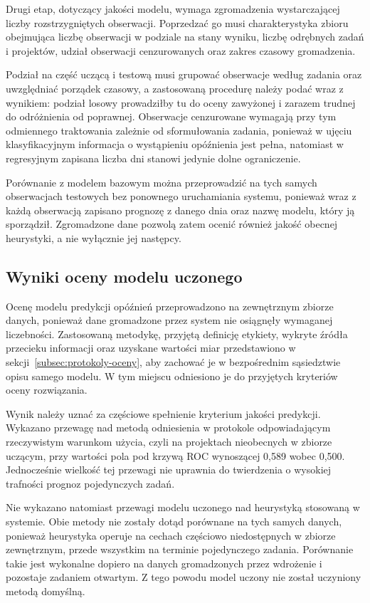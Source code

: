 Drugi etap, dotyczący jakości modelu, wymaga zgromadzenia wystarczającej liczby rozstrzygniętych obserwacji. Poprzedzać go musi charakterystyka zbioru obejmująca liczbę obserwacji w podziale na stany wyniku, liczbę odrębnych zadań i projektów, udział obserwacji cenzurowanych oraz zakres czasowy gromadzenia.

Podział na część uczącą i testową musi grupować obserwacje według zadania oraz uwzględniać porządek czasowy, a zastosowaną procedurę należy podać wraz z wynikiem: podział losowy prowadziłby tu do oceny zawyżonej i zarazem trudnej do odróżnienia od poprawnej. Obserwacje cenzurowane wymagają przy tym odmiennego traktowania zależnie od sformułowania zadania, ponieważ w ujęciu klasyfikacyjnym informacja o wystąpieniu opóźnienia jest pełna, natomiast w regresyjnym zapisana liczba dni stanowi jedynie dolne ograniczenie.

Porównanie z modelem bazowym można przeprowadzić na tych samych obserwacjach testowych bez ponownego uruchamiania systemu, ponieważ wraz z każdą obserwacją zapisano prognozę z danego dnia oraz nazwę modelu, który ją sporządził. Zgromadzone dane pozwolą zatem ocenić również jakość obecnej heurystyki, a nie wyłącznie jej następcy.

\subsection{Wyniki oceny modelu uczonego}

Ocenę modelu predykcji opóźnień przeprowadzono na zewnętrznym zbiorze danych, ponieważ dane gromadzone przez system nie osiągnęły wymaganej liczebności. Zastosowaną metodykę, przyjętą definicję etykiety, wykryte źródła przecieku informacji oraz uzyskane wartości miar przedstawiono w sekcji~\ref{subsec:protokoly-oceny}, aby zachować je w bezpośrednim sąsiedztwie opisu samego modelu. W tym miejscu odniesiono je do przyjętych kryteriów oceny rozwiązania.

Wynik należy uznać za częściowe spełnienie kryterium jakości predykcji. Wykazano przewagę nad metodą odniesienia w protokole odpowiadającym rzeczywistym warunkom użycia, czyli na projektach nieobecnych w zbiorze uczącym, przy wartości pola pod krzywą ROC wynoszącej 0,589 wobec 0,500. Jednocześnie wielkość tej przewagi nie uprawnia do twierdzenia o wysokiej trafności prognoz pojedynczych zadań.

Nie wykazano natomiast przewagi modelu uczonego nad heurystyką stosowaną w systemie. Obie metody nie zostały dotąd porównane na tych samych danych, ponieważ heurystyka operuje na cechach częściowo niedostępnych w zbiorze zewnętrznym, przede wszystkim na terminie pojedynczego zadania. Porównanie takie jest wykonalne dopiero na danych gromadzonych przez wdrożenie i pozostaje zadaniem otwartym. Z tego powodu model uczony nie został uczyniony metodą domyślną.

